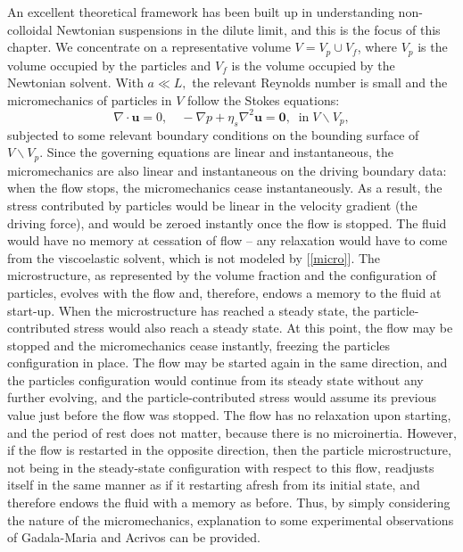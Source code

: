 \documentclass[english,fleqn,allpages]{ISTE_science}[2018/07/30]
\begin{document}
An excellent theoretical framework has been built up in understanding
non-colloidal Newtonian suspensions in the dilute limit, and this is the focus of this
chapter. We concentrate on a representative volume
$V=V_{p}\cup V_{f}$, where $V_{p}$ is the volume occupied by the
particles and $V_{f}$ is the volume occupied by the Newtonian solvent.
With $a\ll L,$ the relevant Reynolds number is small and the micromechanics
of particles in $V$ follow the Stokes equations:
\begin{equation}
\nabla\cdot\mathbf{u}=0,\quad-\nabla p+\eta_{s}\nabla^{2}\mathbf{u}=\mathbf{0},\;\;\mathrm{in\;}V\backslash V_{p},\label{micro}
\end{equation}
subjected to some relevant boundary conditions on the bounding surface
of $V\backslash V_{p}.$ Since the governing equations are linear
and instantaneous, the micromechanics are also linear and instantaneous
on the driving boundary data: when the flow stops, the micromechanics
cease instantaneously. As a result, the stress contributed by particles
would be linear in the velocity gradient (the driving force), and
would be zeroed instantly once the flow is stopped. The fluid would
have no memory at cessation of flow -- any relaxation would have to
come from the viscoelastic solvent, which is not modeled by [\ref{micro}].
The microstructure, as represented by the volume fraction and the
configuration of particles, evolves with the flow and, therefore,
endows a memory to the fluid at start-up. When the microstructure
has reached a steady state, the particle-contributed stress
would also reach a steady state. At this point, the flow may be stopped
and the micromechanics cease instantly, freezing the particles configuration
in place. The flow may be started again in the same direction, and
the particles configuration would continue from its steady state without
any further evolving, and the particle-contributed stress would assume
its previous value just before the flow was stopped. The flow has
no relaxation upon starting, and the period of rest does not matter,
because there is no microinertia. However, if the flow is restarted in the
opposite direction, then the particle microstructure,  not being in
the steady-state configuration with respect to this flow, readjusts
itself in the same manner as if it restarting afresh from its initial
state, and therefore endows the fluid with a memory as before. Thus,
by simply considering the nature of the micromechanics, explanation
to some experimental observations of Gadala-Maria and Acrivos \cite{Gadala80}
can be provided.%
\end{document}
